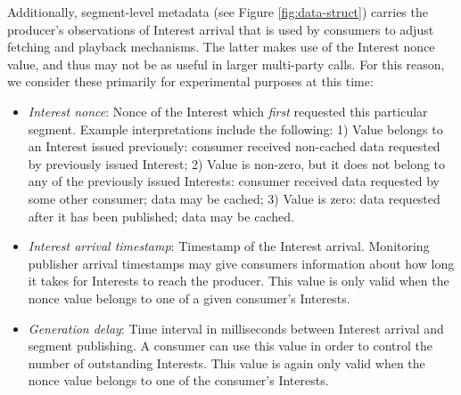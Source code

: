 \documentclass{icn/sig-alternate-2013} %
\begin{document}
Additionally, segment-level metadata (see Figure \ref{fig:data-struct}) carries the producer's observations of Interest arrival that is used by consumers to adjust fetching and playback mechanisms.  
The latter makes use of the Interest nonce value, and thus may not be as useful in larger multi-party calls. 
For this reason, we consider these primarily for experimental purposes at this time:
\begin{itemize} [label={}]
\item \textit{Interest nonce}: Nonce of the Interest which \textit{first} requested this particular segment. Example interpretations include the following:  1) Value belongs to an Interest issued previously: consumer received non-cached data requested by previously issued Interest; 2) Value is non-zero, but it does not belong to any of the previously issued Interests:  consumer received data requested by some other consumer; data may be cached; 3) Value is zero: data requested after it has been published; data may be cached.
\item \textit{Interest arrival timestamp}: Timestamp of the Interest arrival. Monitoring publisher arrival timestamps may give consumers information about how long it takes for Interests to reach the producer. This value is only valid when the nonce value belongs to one of a given consumer's Interests.
\item \textit{Generation delay}: Time interval in milliseconds between Interest arrival and segment publishing. A consumer can use this value in order to control the number of outstanding Interests. This value is again only valid when the nonce value belongs to one of the consumer's Interests.
\end{itemize}



%

%
\end{document}
